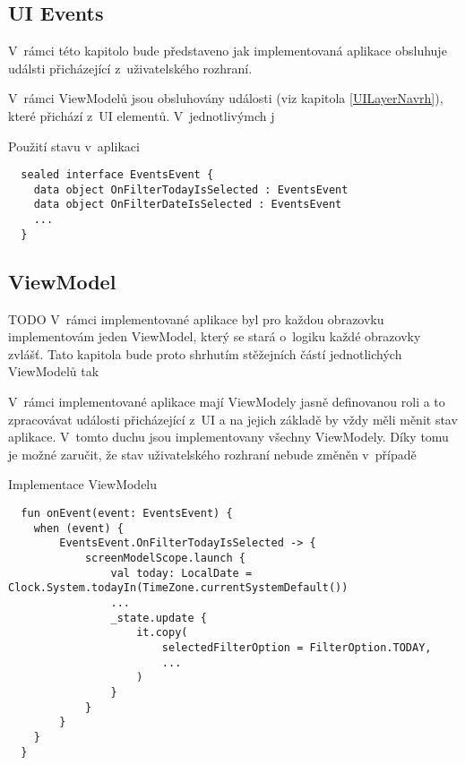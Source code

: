 \subsection{UI Events} \label{eventHandlingImpl}
V~rámci této kapitolo bude představeno jak implementovaná aplikace obsluhuje událsti přicházející z~uživatelského rozhraní.


V~rámci ViewModelů jsou obsluhovány události (viz kapitola \ref{UILayerNavrh}), které přichází z~UI elementů. V~jednotlivýmch j


\begin{listing}[H]
\caption{Použití stavu v~aplikaci}\label{lst:EventsImpl}
\begin{verbatim}
  sealed interface EventsEvent {
    data object OnFilterTodayIsSelected : EventsEvent
    data object OnFilterDateIsSelected : EventsEvent
    ...
  }
\end{verbatim}
\end{listing}

\subsection{ViewModel} \label{ViewModelImpl}
TODO %
V~rámci implementované aplikace byl pro každou obrazovku implementovám jeden ViewModel, který se stará o~logiku každé obrazovky zvlášť. Tato kapitola 
bude proto shrhutím stěžejních částí jednotlichých ViewModelů tak 


V~rámci implementované aplikace mají ViewModely jasně definovanou roli a to zpracovávat události přicházející z~UI a na jejich základě by vždy měli
měnit stav aplikace. V~tomto duchu jsou implementovany všechny ViewModely. Díky tomu je možné zaručit, že stav uživatelského rozhraní  nebude změněn
v~případě 
\begin{listing}[H]
\caption{Implementace ViewModelu}\label{lst:ViewModelImpl}
\begin{verbatim}
  fun onEvent(event: EventsEvent) {
    when (event) {
        EventsEvent.OnFilterTodayIsSelected -> {
            screenModelScope.launch {
                val today: LocalDate = Clock.System.todayIn(TimeZone.currentSystemDefault())
                ...
                _state.update {
                    it.copy(
                        selectedFilterOption = FilterOption.TODAY,
                        ...
                    )
                }
            }
        }
    }
  }
\end{verbatim}
\end{listing}

